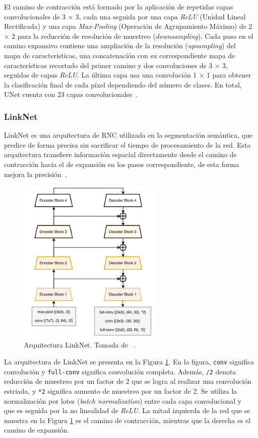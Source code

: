 El camino de contracción está formado por la aplicación de repetidas capas convolucionales de 3 $\times$ 3, cada una seguida por una capa \textit{ReLU} (Unidad Lineal Rectificada) y una capa \textit{Max-Pooling} (Operación de Agrupamiento Máximo) de 2 $\times$ 2 para la reducción de resolución de muestreo (\textit{downsampling}). Cada paso en el camino expansivo contiene una ampliación de la resolución (\textit{upsampling}) del mapa de características, una concatenación con su correspondiente mapa de características recortado del primer camino y dos convoluciones de 3 $\times$ 3, seguidas de capas \textit{ReLU}. La última capa usa una convolución 1 $\times$ 1 para obtener la clasificación final de cada píxel dependiendo del número de clases. En total, UNet cuenta con 23 capas convolucionales~\cite{ronneberger2015u}.

\subsubsection{LinkNet}

LinkNet es una arquitectura de RNC utilizada en la segmentación semántica, que predice de forma precisa sin sacrificar el tiempo de procesamiento de la red. Esta arquitectura transfiere información espacial directamente desde el camino de contracción hacia el de expansión en los pasos correspondiente, de esta forma mejora la precisión~\cite{chaurasia2017linknet}.

\begin{figure}[ht]
	\centering
	\includegraphics[width=7cm]{./Graphics/linknet.png}
	\caption{Arquitectura LinkNet. Tomada de ~\cite{chaurasia2017linknet}.}
	\label{fig:linknet}
\end{figure}

La arquitectura de LinkNet se presenta en la Figura \ref{fig:linknet}. En la figura, \verb|conv| significa convolución y \verb|full-conv| significa convolución completa. Además, \verb|/2| denota reducción de muestreo por un factor de 2 que se logra al realizar una convolución estriada, y \verb|*2| significa aumento de muestreo por un factor de 2. Se utiliza la normalización por lotes (\textit{batch normalization}) entre cada capa convolucional y que es seguida por la no linealidad de \textit{ReLU}. La mitad izquierda de la red que se muestra en la Figura \ref{fig:linknet} es el camino de contracción, mientras que la derecha es el camino de expansión.


